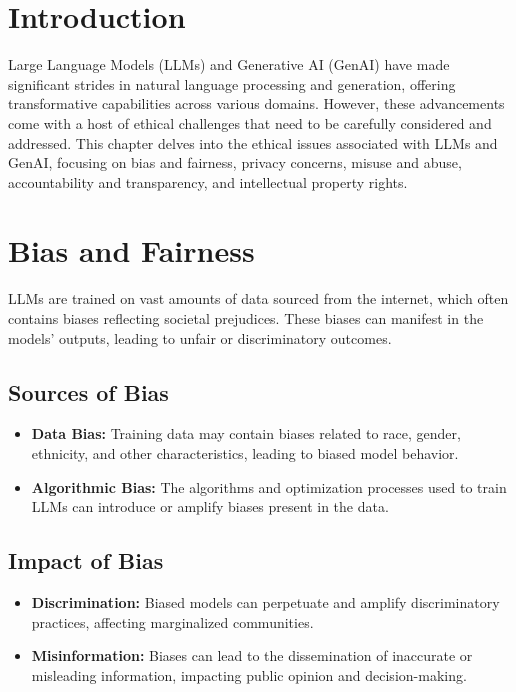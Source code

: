 \section{Introduction}
Large Language Models (LLMs) and Generative AI (GenAI) have made significant strides in natural language processing and generation, offering transformative capabilities across various domains. However, these advancements come with a host of ethical challenges that need to be carefully considered and addressed. This chapter delves into the ethical issues associated with LLMs and GenAI, focusing on bias and fairness, privacy concerns, misuse and abuse, accountability and transparency, and intellectual property rights.

\section{Bias and Fairness}
LLMs are trained on vast amounts of data sourced from the internet, which often contains biases reflecting societal prejudices. These biases can manifest in the models' outputs, leading to unfair or discriminatory outcomes.

\subsection{Sources of Bias}
\begin{itemize}
    \item \textbf{Data Bias:} Training data may contain biases related to race, gender, ethnicity, and other characteristics, leading to biased model behavior.
    \item \textbf{Algorithmic Bias:} The algorithms and optimization processes used to train LLMs can introduce or amplify biases present in the data.
\end{itemize}

\subsection{Impact of Bias}
\begin{itemize}
    \item \textbf{Discrimination:} Biased models can perpetuate and amplify discriminatory practices, affecting marginalized communities.
    \item \textbf{Misinformation:} Biases can lead to the dissemination of inaccurate or misleading information, impacting public opinion and decision-making.
\end{itemize}

